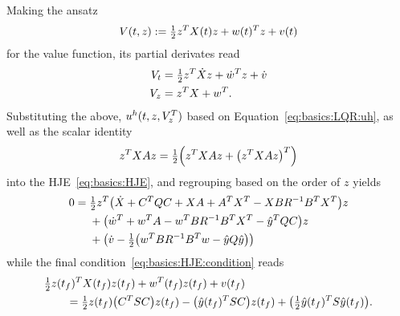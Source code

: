 Making the ansatz
\begin{equation}
\label{eq:basics:LQR:ansatz}
  V(t,z) := \tfrac{1}{2} z^T X(t) z + w(t)^T z + v(t)
\end{equation}
for the value function,
its partial derivates read
\begin{equation}
\begin{aligned}
  V_t &= \tfrac{1}{2} z^T \dot X z + \dot w^T z + \dot v \\
  V_z &= z^T X + w^T
  .
\end{aligned}
\end{equation}
Substituting the above, $u^h(t, z, V_z^T)$ based on Equation~\eqref{eq:basics:LQR:uh},
as well as the scalar identity
\begin{equation}
  z^T X A z = \tfrac{1}{2} \Big( z^T X A z + \big( z^T X A z \big)^T \Big)
\end{equation}
into the \ac{HJE}~\eqref{eq:basics:HJE},
and regrouping based on the order of $z$ yields
\begin{subequations}
\label{eq:basics:LQR:HJE}
\begin{align}
  0 ={}
\label{eq:basics:LQR:HJE:X}
  & \tfrac{1}{2} z^T \big( \dot X + C^T Q C + X A + A^T X^T - X B R^{-1} B^T X^T \big) z \\
  & + \big( \dot w^T + w^T A - w^T B R^{-1} B^T X^T - \hat y^T Q C \big) z \\
  & + \big( \dot v - \tfrac{1}{2} \big( w^T B R^{-1} B^T w - \hat y Q \hat y \big) \big)
\end{align}
\end{subequations}
while the final condition~\eqref{eq:basics:HJE:condition} reads
\begin{equation}
\label{eq:basics:LQR:condition}
\begin{aligned}
  \MoveEqLeft
  \onehalf z(t_f)^\T X(t_f) z(t_f) + w^\T (t_f) z(t_f) + v(t_f)
  \\
  &= \onehalf z(t_f) \big( C^\T S C \big) z(t_f)
  - \big( \hat y(t_f)^\T S C \big) z(t_f)
  + \big( \onehalf \hat y(t_f)^\T S \hat y(t_f) \big)
  .
\end{aligned}
\end{equation}

